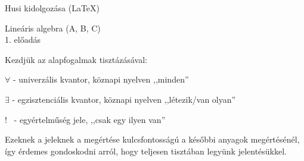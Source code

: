 \documentclass[a4paper,11.5pt]{article}
\begin{document}


	\def\a{\textbf{a}}

	\def\b{\textbf{b}}

	\def\N{\hskip 10 true mm}

	\def\a{\textbf{a}}

	\def\b{\textbf{b}}

	\def\c{\textbf{c}}

	\def\d{\textbf{d}}

	\def\e{\textbf{e}}

	\def\gg{$\gamma$}

	\def\vi{\textbf{i}}

	\def\jj{\textbf{j}}

	\def\kk{\textbf{k}}

	\def\fh{\overrightarrow}

	\def\l{\lambda}

	\def\m{\mu}

	\def\v{\textbf{v}}

	\def\0{\textbf{0}}

	\def\s{\hspace{0.2mm}\vphantom{\beta}}

	\def\Z{\mathbb{Z}}
	\def\Q{\mathbb{Q}}
	\def\R{\mathbb{R}}
	\def\C{\mathbb{C}}
	\def\N{\mathbb{N}}
	\def\Rn{\mathbb{R}^{n}}



	\begin{flushright}

		Husi kidolgozása (\LaTeX)

	\end{flushright}

	\begin{center}

		Lineáris algebra (A, B, C)\\

	1. előadás

	\end{center}

	\noindent Kezdjük az alapfogalmak tisztázásával:
	\begin{compactitem}
		\item $\forall$ - univerzális kvantor, köznapi nyelven ,,minden''
		\item $\exists$ - egzisztenciális kvantor, köznapi nyelven ,,létezik/van olyan''
		\item $!$ \ - egyértelműség jele, ,,csak egy ilyen van''
	\end{compactitem}
	Ezeknek a jeleknek a megértése kulcsfontosságú a későbbi anyagok megértésénél, így érdemes gondoskodni arról, hogy teljesen tisztában legyünk jelentésükkel.
	
\end{document}
